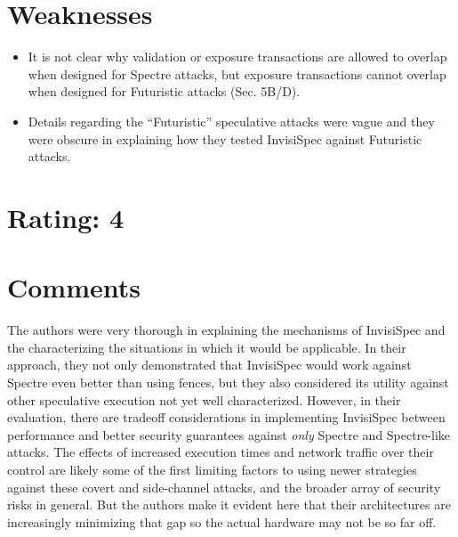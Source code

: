 \documentclass [12pt]{article}
\begin{document}
    \section{Weaknesses} %
    \label{sec:weaknesses}
        \begin{itemize}
            \item It is not clear why validation or exposure transactions are allowed to overlap when designed for Spectre attacks, but exposure transactions cannot overlap when designed for Futuristic attacks (Sec. 5B/D).
            
            \item Details regarding the ``Futuristic'' speculative attacks were vague and they were obscure in explaining how they tested InvisiSpec against Futuristic attacks. 
        \end{itemize}

    \section{Rating: 4} %
    \label{sec:rating}

    \section{Comments} %
    \label{sec:comments}

    The authors were very thorough in explaining the mechanisms of InvisiSpec and the characterizing the situations in which it would be applicable. In their approach, they not only demonstrated that InvisiSpec would work against Spectre even better than using fences, but they also considered its utility against other speculative execution not yet well characterized. However, in their evaluation, there are tradeoff considerations in implementing InvisiSpec between performance and better security guarantees against \emph{only} Spectre and Spectre-like attacks. The effects of increased execution times and network traffic over their control are likely some of the first limiting factors to using newer strategies against these covert and side-channel attacks, and the broader array of security risks in general. But the authors make it evident here that their architectures are increasingly minimizing that gap so the actual hardware may not be so far off. 
\end{document}
